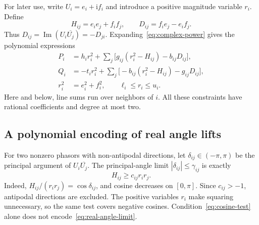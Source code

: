 For later use, write $U_i=e_i+\mathrm{i}f_i$ and introduce a positive magnitude
variable $r_i$. Define
\begin{equation}
 H_{ij}=e_ie_j+f_if_j,\qquad D_{ij}=f_ie_j-e_if_j.
 \label{eq:dot-cross}
\end{equation}
Thus $D_{ij}=\operatorname{Im}(U_i\overline{U_j})=-D_{ji}$.
Expanding~\eqref{eq:complex-power} gives the polynomial expressions
\begin{align}
 P_i&=h_ir_i^2+\sum_j\bigl[g_{ij}(r_i^2-H_{ij})-b_{ij}D_{ij}\bigr],
 \label{eq:rect-P}\\
 Q_i&=-t_ir_i^2+\sum_j\bigl[-b_{ij}(r_i^2-H_{ij})-g_{ij}D_{ij}\bigr],
 \label{eq:rect-Q}\\
 r_i^2&=e_i^2+f_i^2,\qquad \ell_i\le r_i\le u_i.
 \label{eq:rect-magnitude}
\end{align}
Here and below, line sums run over neighbors of $i$. All these constraints
have rational coefficients and degree at most two.

\subsection{A polynomial encoding of real angle lifts}

For two nonzero phasors with non-antipodal directions, let
$\delta_{ij}\in(-\pi,\pi)$ be the principal argument of
$U_i\overline{U_j}$. The principal-angle limit
$|\delta_{ij}|\le\gamma_{ij}$ is exactly
\begin{equation}
 H_{ij}\ge c_{ij}r_ir_j.
 \label{eq:cosine-test}
\end{equation}
Indeed, $H_{ij}/(r_ir_j)=\cos\delta_{ij}$, and cosine decreases on $[0,\pi]$.
Since $c_{ij}>-1$, antipodal directions are excluded. The positive variables
$r_i$ make squaring unnecessary, so the same test covers negative cosines.
Condition~\eqref{eq:cosine-test} alone does not encode~\eqref{eq:real-angle-limit}.

